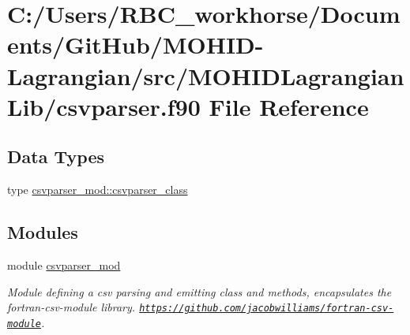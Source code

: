 \hypertarget{csvparser_8f90}{}\section{C\+:/\+Users/\+R\+B\+C\+\_\+workhorse/\+Documents/\+Git\+Hub/\+M\+O\+H\+I\+D-\/\+Lagrangian/src/\+M\+O\+H\+I\+D\+Lagrangian\+Lib/csvparser.f90 File Reference}
\label{csvparser_8f90}
\subsection*{Data Types}
\begin{DoxyCompactItemize}
\item 
type \mbox{\hyperlink{structcsvparser__mod_1_1csvparser__class}{csvparser\+\_\+mod\+::csvparser\+\_\+class}}
\end{DoxyCompactItemize}
\subsection*{Modules}
\begin{DoxyCompactItemize}
\item 
module \mbox{\hyperlink{namespacecsvparser__mod}{csvparser\+\_\+mod}}
\begin{DoxyCompactList}\small\item\em Module defining a csv parsing and emitting class and methods, encapsulates the fortran-\/csv-\/module library. \href{https://github.com/jacobwilliams/fortran-csv-module}{\tt https\+://github.\+com/jacobwilliams/fortran-\/csv-\/module}. \end{DoxyCompactList}\end{DoxyCompactItemize}

